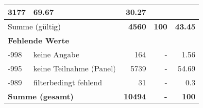 \begin{longtable}{lXrrr}
       \num{3177} &
       \num[round-mode=places,round-precision=2]{69.67} &
         \num[round-mode=places,round-precision=2]{30.27} \\
     \midrule
     \multicolumn{2}{l}{Summe (gültig)} &
       \textbf{\num{4560}} &
     \textbf{\num{100}} &
       \textbf{\num[round-mode=places,round-precision=2]{43.45}} \\
     \multicolumn{5}{l}{\textbf{Fehlende Werte}}\\
       -998 &
       keine Angabe &
         \num{164} &
        - &
         \num[round-mode=places,round-precision=2]{1.56} \\
       -995 &
       keine Teilnahme (Panel) &
         \num{5739} &
        - &
         \num[round-mode=places,round-precision=2]{54.69} \\
       -989 &
       filterbedingt fehlend &
         \num{31} &
        - &
         \num[round-mode=places,round-precision=2]{0.3} \\
     \midrule
     \multicolumn{2}{l}{\textbf{Summe (gesamt)}} &
          \textbf{\num{10494}} &
        \textbf{-} &
        \textbf{\num{100}} \\
     \bottomrule
     \end{longtable}
     
